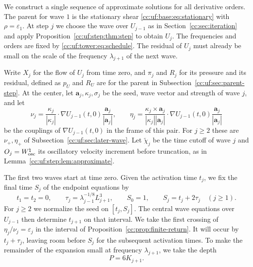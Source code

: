 We construct a single sequence of approximate solutions for all
derivative orders. The parent for wave $1$ is the stationary shear
\eqref{cc:uf:base:eq:stationary} with $\rho=\varepsilon_1$. At step $j$
we choose the wave over $U_{j-1}$ as in Section~\ref{cc:sec:iteration}
and apply Proposition~\ref{cc:uf:step:thm:step} to obtain $U_j$.
The frequencies and orders are fixed by \eqref{cc:uf:tower:eq:schedule}.
The residual of $U_j$ must already be small on the scale of the
frequency $\lambda_{j+1}$ of the next wave.

Write $X_j$ for the flow of $U_j$ from time zero, and $\pi_j$ and $R_j$
for its pressure and its residual, defined as $p_U$ and $R_U$ are for
the parent in Subsection~\ref{cc:uf:sec:parent-step}.
At the center, let $\mathbf a_j,\kappa_j,\sigma_j$ be the seed,
wave vector and strength of wave $j$, and let
\begin{equation}\label{cc:uf:tower:eq:couplings}
 \nu_j=\frac{\kappa_j}{|\kappa_j|}\cdot\nabla U_{j-1}(t,0)
        \frac{\mathbf a_j}{|\mathbf a_j|},\qquad
 \eta_j=\frac{\kappa_j\times\mathbf a_j}{|\kappa_j||\mathbf a_j|}
        \cdot\nabla U_{j-1}(t,0)\frac{\mathbf a_j}{|\mathbf a_j|}
\end{equation}
be the couplings of $\nabla U_{j-1}(t,0)$ in the frame of this pair.
For $j\ge2$ these are $\nu_+,\eta_+$ of Subsection~\ref{cc:uf:sec:later-wave}.
Let $\widetilde\chi_j$ be the time cutoff of wave $j$ and
$O_j=W_{\rm osc}^\natural$ its oscillatory velocity increment before
truncation, as in Lemma~\ref{cc:uf:step:lem:approximate}.

The first two waves start at time zero. Given the activation time $t_j$,
we fix the final time $S_j$ of the endpoint equations by
\[
 t_1=t_2=0,\qquad
 \tau_j=\lambda_{j-1}^{-1/8}L_{j+1}^3,\qquad
 S_0=1,\qquad S_j=t_j+2\tau_j\quad(j\ge1).
\]
For $j\ge2$ we normalize the seed on $[t_j,S_j]$. The central wave
equations over $U_{j-1}$ then determine $t_{j+1}$ on that interval.
We take the first crossing
of $\eta_j/\nu_j=\varepsilon_j$ in the interval of
Proposition~\ref{cc:prop:finite-return}. It will occur by $t_j+\tau_j$,
leaving room before $S_j$ for the subsequent activation times.
To make the remainder of the expansion small at frequency $\lambda_{j+1}$,
we take the depth
\begin{equation}\label{cc:uf:tower:eq:step-orders}
 P=6K_{j+1}.
\end{equation}

